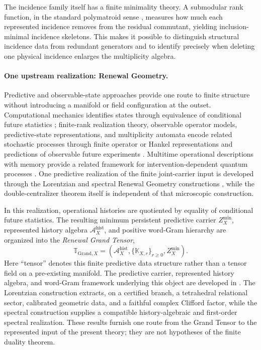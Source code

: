 \documentclass[11pt]{article}
\numberwithin{equation}{section}
\theoremstyle{definition}
\theoremstyle{remark}
\newcommand{\GTX}{\boldsymbol{\mathbb T}_{\mathrm{Grand},X}}
\begin{document}
The incidence family itself has a finite minimality theory.  A submodular
rank function, in the standard polymatroid sense \cite{Fujishige2005},
measures how much each represented incidence removes from the
residual commutant, yielding inclusion-minimal incidence skeletons.  This
makes it possible to distinguish structural incidence data from redundant
generators and to identify precisely when deleting one physical incidence
enlarges the multiplicity algebra.


\paragraph{One upstream realization: Renewal Geometry.}

Predictive and observable-state approaches provide one route to finite
structure without introducing a manifold or field configuration at the
outset.  Computational mechanics identifies states through equivalence of
conditional future statistics \cite{ShaliziCrutchfield2001}; finite-rank
realization theory, observable operator models, predictive-state
representations, and multiplicity automata encode related stochastic
processes through finite operator or Hankel representations and predictions
of observable future experiments
\cite{CarlylePaz1971,Jaeger2000,SinghJamesRudary2004,ThonJaeger2015}.
Multitime operational descriptions with memory provide a related framework
for intervention-dependent quantum processes
\cite{ChiribellaEtAl2009,PollockEtAl2018}.  One predictive realization of the finite joint-carrier input is developed
through the Lorentzian and spectral Renewal Geometry constructions
\cite{PelissierSpacetime2026,PelissierSpectral2026}, while the
double-centralizer theorem itself is independent of that microscopic
construction.

In this realization, operational histories are quotiented by equality of
conditional future statistics.  The resulting minimum persistent predictive
carrier $Z_X^{\min}$, represented history algebra
$\mathcal A_X^{\mathrm{hist}}$, and positive word-Gram hierarchy are organized
into the \emph{Renewal Grand Tensor},
\begin{equation}
\boxed{
\GTX
=
\left(
\mathcal A_X^{\mathrm{hist}},
\{\mathbb K_{X,r}\}_{r\ge0},
Z_X^{\min}
\right).}
\label{eq:intro-grand-tensor}
\end{equation}
Here ``tensor'' denotes this finite predictive data structure rather than a
tensor field on a pre-existing manifold.  The predictive carrier, represented
history algebra, and word-Gram framework underlying this object are developed
in \cite{PelissierSpacetime2026,PelissierSpectral2026}.  The Lorentzian
construction \cite{PelissierSpacetime2026} extracts, on a certified branch, a
tetrahedral relational sector, calibrated geometric data, and a faithful
complex Clifford factor, while the spectral construction
\cite{PelissierSpectral2026} supplies a compatible history-algebraic and
first-order spectral realization.  These results furnish one route from the
Grand Tensor to the represented input of the present theory; they are not
hypotheses of the finite duality theorem.
\end{document}
